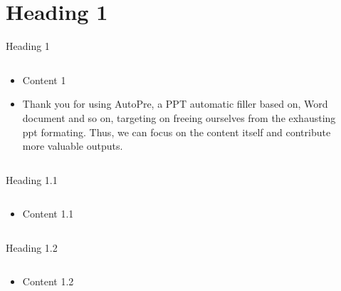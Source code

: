 \documentclass{sintefbeamer}
\title{}
\subtitle{}
\author{}
\date{}
\begin{document}
\maketitle

\section{Heading 1}

\begin{frame}{Heading 1}
    \begin{columns}
        \begin{column}{0.6\textwidth}
            \begin{itemize}
                \item Content 1
                \item Thank you for using AutoPre, a PPT automatic filler based on, Word document and so on, targeting on freeing ourselves from the exhausting ppt formating. Thus, we can focus on the content itself and contribute more valuable outputs.
            \end{itemize}
        \end{column}
        \begin{column}{0.3\textwidth}
            
        \end{column}
    \end{columns}
\end{frame}

\begin{frame}{Heading 1.1}
    \begin{columns}
        \begin{column}{0.6\textwidth}
            \begin{itemize}
                \item Content 1.1
            \end{itemize}
        \end{column}
        \begin{column}{0.3\textwidth}
            
        \end{column}
    \end{columns}
\end{frame}

\begin{frame}{Heading 1.2}
    \begin{columns}
        \begin{column}{0.6\textwidth}
            \begin{itemize}
                \item Content 1.2
            \end{itemize}
        \end{column}
        \begin{column}{0.3\textwidth}
            
        \end{column}
    \end{columns}
\end{frame}
\end{document}
